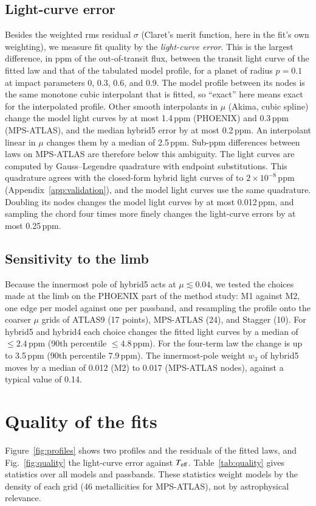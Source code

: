 \documentclass{aa}
\newcommand{\ppm}{\,\textrm{ppm}}
\newcommand{\teff}{T_{\rm eff}}
\begin{document}
\subsection{Light-curve error}\label{sec:lcerr}
Besides the weighted rms residual $\sigma$ (Claret's merit function, here in
the fit's own weighting), we measure fit quality by the \emph{light-curve
error}. This is the largest difference, in ppm of the out-of-transit flux,
between the transit light curve of the fitted law and that of the tabulated
model profile, for a planet of radius $p=0.1$ at impact parameters 0, 0.3, 0.6,
and 0.9. The model profile between its nodes is the same monotone cubic
interpolant that is fitted, so ``exact'' here means exact for the interpolated
profile. Other smooth interpolants in $\mu$ (Akima, cubic spline) change the
model light curves by at most 1.4\ppm{} (PHOENIX) and 0.3\ppm{} (MPS-ATLAS),
and the median hybrid5 error by at most 0.2\ppm. An interpolant linear in
$\mu$ changes them by a median of 2.5\ppm. Sub-ppm differences between laws on
MPS-ATLAS are therefore below this ambiguity. The light curves are computed by
Gauss--Legendre quadrature with endpoint substitutions. This quadrature agrees
with the closed-form hybrid light curves of \citet{squishier} to $2\times10^{-8}\ppm$
(Appendix~\ref{app:validation}), and the model light curves use the same
quadrature. Doubling its nodes changes the model light curves by at most
0.012\ppm, and sampling the chord four times more finely changes the
light-curve errors by at most 0.25\ppm.

\subsection{Sensitivity to the limb}
Because the innermost pole of hybrid5 acts at $\mu\lesssim0.04$, we tested the
choices made at the limb on the PHOENIX part of the method study: M1 against
M2, one edge per model against one per passband, and resampling the profile
onto the coarser $\mu$ grids of ATLAS9 (17 points), MPS-ATLAS (24), and Stagger
(10). For hybrid5 and hybrid4 each choice changes the fitted light curves by a
median of $\le2.4\ppm$ (90th percentile $\le4.8\ppm$). For the four-term law
the change is up to 3.5\ppm{} (90th percentile 7.9\ppm). The innermost-pole
weight $w_3$ of hybrid5 moves by a median of 0.012 (M2) to 0.017 (MPS-ATLAS
nodes), against a typical value of 0.14.

\section{Quality of the fits}\label{sec:quality}
Figure~\ref{fig:profiles} shows two profiles and the residuals of the fitted
laws, and Fig.~\ref{fig:quality} the light-curve error against $\teff$.
Table~\ref{tab:quality} gives statistics over all models and passbands. These
statistics weight models by the density of each grid (46 metallicities for
MPS-ATLAS), not by astrophysical relevance.
\end{document}
